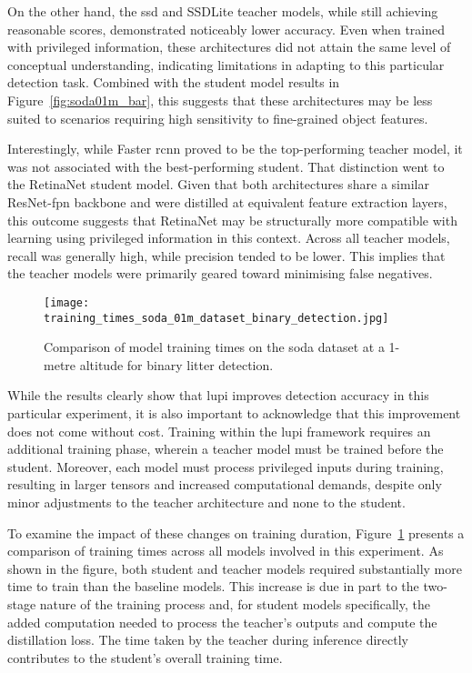 On the other hand, the \gls{ssd} and SSDLite teacher models, while still achieving reasonable scores, demonstrated noticeably lower accuracy. Even when trained with privileged information, these architectures did not attain the same level of conceptual understanding, indicating limitations in adapting to this particular detection task. Combined with the student model results in Figure~\ref{fig:soda01m_bar}, this suggests that these architectures may be less suited to scenarios requiring high sensitivity to fine-grained object features.

Interestingly, while Faster \gls{rcnn} proved to be the top-performing teacher model, it was not associated with the best-performing student. That distinction went to the RetinaNet student model. Given that both architectures share a similar ResNet-\gls{fpn} backbone and were distilled at equivalent feature extraction layers, this outcome suggests that RetinaNet may be structurally more compatible with learning using privileged information in this context.
Across all teacher models, recall was generally high, while precision tended to be lower. This implies that the teacher models were primarily geared toward minimising false negatives.

\begin{figure}[!b]
    \centering
    \texttt{[image: training\_times\_soda\_01m\_dataset\_binary\_detection.jpg]}
    \caption{Comparison of model training times on the \gls{soda} dataset at a 1-metre altitude for binary litter detection.}
    \label{fig:soda01m_training_time}
\end{figure}

While the results clearly show that \gls{lupi} improves detection accuracy in this particular experiment, it is also important to acknowledge that this improvement does not come without cost. Training within the \gls{lupi} framework requires an additional training phase, wherein a teacher model must be trained before the student. Moreover, each model must process privileged inputs during training, resulting in larger tensors and increased computational demands, despite only minor adjustments to the teacher architecture and none to the student.


To examine the impact of these changes on training duration, Figure~\ref{fig:soda01m_training_time} presents a comparison of training times across all models involved in this experiment. As shown in the figure, both student and teacher models required substantially more time to train than the baseline models. This increase is due in part to the two-stage nature of the training process and, for student models specifically, the added computation needed to process the teacher’s outputs and compute the distillation loss. The time taken by the teacher during inference directly contributes to the student’s overall training time.

